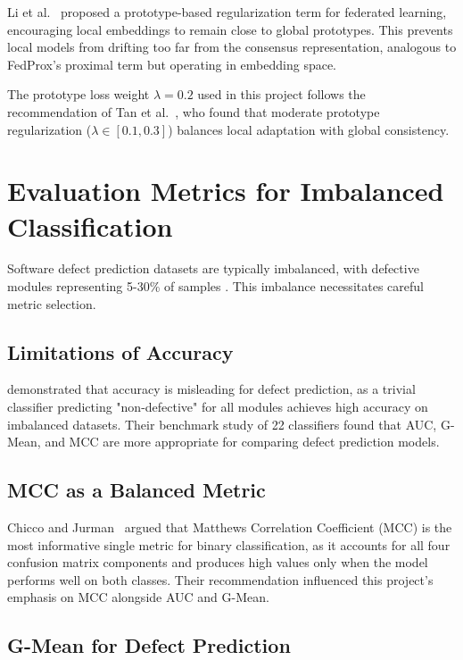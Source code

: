 Li et al.~\citep{li2021prototype} proposed a prototype-based regularization term for federated learning, encouraging local embeddings to remain close to global prototypes. This prevents local models from drifting too far from the consensus representation, analogous to FedProx's proximal term but operating in embedding space.

The prototype loss weight \(\lambda = 0.2\) used in this project follows the recommendation of Tan et al.~\citep{tan2022fedproto}, who found that moderate prototype regularization (\(\lambda \in [0.1, 0.3]\)) balances local adaptation with global consistency.

\section{Evaluation Metrics for Imbalanced Classification}

Software defect prediction datasets are typically imbalanced, with defective modules representing 5-30\% of samples \citep{rodriguez2014comparison}. This imbalance necessitates careful metric selection.

\subsection{Limitations of Accuracy}

\cite{lessmann2008benchmark} demonstrated that accuracy is misleading for defect prediction, as a trivial classifier predicting "non-defective" for all modules achieves high accuracy on imbalanced datasets. Their benchmark study of 22 classifiers found that AUC, G-Mean, and MCC are more appropriate for comparing defect prediction models.

\subsection{MCC as a Balanced Metric}

Chicco and Jurman~\citep{chicco2020advantages} argued that Matthews Correlation Coefficient (MCC) is the most informative single metric for binary classification, as it accounts for all four confusion matrix components and produces high values only when the model performs well on both classes. Their recommendation influenced this project's emphasis on MCC alongside AUC and G-Mean.

\subsection{G-Mean for Defect Prediction}

